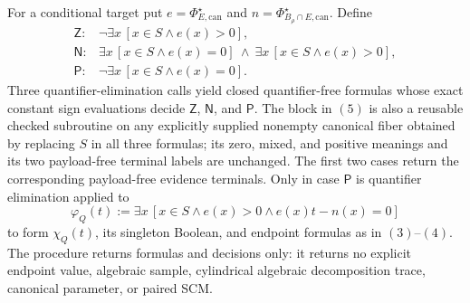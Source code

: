For a conditional target put \(e=\Phi_{E,\mathrm{can}}^\star\) and \(n=\Phi_{B_\rho\cap E,\mathrm{can}}^\star\).  Define
\[
\begin{array}{ll}
\mathsf Z:&\neg\exists x\,[x\in S\wedge e(x)>0],\\
\mathsf N:&\exists x\,[x\in S\wedge e(x)=0]
\ \wedge\ \exists x\,[x\in S\wedge e(x)>0],\\
\mathsf P:&\neg\exists x\,[x\in S\wedge e(x)=0].
\end{array}
\tag{5}
\]
Three quantifier-elimination calls yield closed quantifier-free formulas whose exact constant sign evaluations decide \(\mathsf Z\), \(\mathsf N\), and \(\mathsf P\).  The block in \((5)\) is also a reusable checked subroutine on any explicitly supplied nonempty canonical fiber obtained by replacing \(S\) in all three formulas; its zero, mixed, and positive meanings and its two payload-free terminal labels are unchanged.  The first two cases return the corresponding payload-free evidence terminals.  Only in case \(\mathsf P\) is quantifier elimination applied to
\[
\varphi_Q(t):=\exists x\,[x\in S\wedge e(x)>0\wedge e(x)t-n(x)=0]
\tag{6}
\]
to form \(\chi_Q(t)\), its singleton Boolean, and endpoint formulas as in \((3)\)--\((4)\).  The procedure returns formulas and decisions only: it returns no explicit endpoint value, algebraic sample, cylindrical algebraic decomposition trace, canonical parameter, or paired SCM.